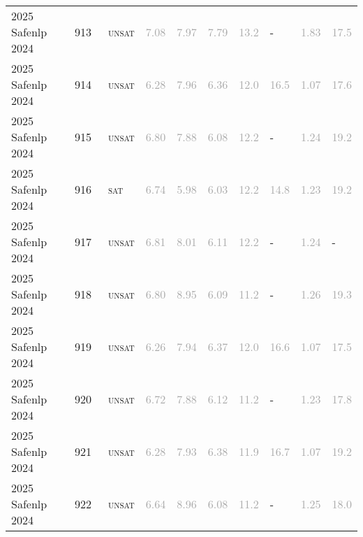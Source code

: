 \begin{center}
{\begin{longtable}{@{}llllllllll@{}}
2025 Safenlp 2024 & 913 & ~\textsc{unsat} & \textcolor{darkgray}{7.08} & \textcolor{darkgray}{7.97} & \textcolor{darkgray}{7.79} & \textcolor{darkgray}{13.2} & - & \textcolor{darkgray}{1.83} & \textcolor{darkgray}{17.5} \\
2025 Safenlp 2024 & 914 & ~\textsc{unsat} & \textcolor{darkgray}{6.28} & \textcolor{darkgray}{7.96} & \textcolor{darkgray}{6.36} & \textcolor{darkgray}{12.0} & \textcolor{darkgray}{16.5} & \textcolor{darkgray}{1.07} & \textcolor{darkgray}{17.6} \\
2025 Safenlp 2024 & 915 & ~\textsc{unsat} & \textcolor{darkgray}{6.80} & \textcolor{darkgray}{7.88} & \textcolor{darkgray}{6.08} & \textcolor{darkgray}{12.2} & - & \textcolor{darkgray}{1.24} & \textcolor{darkgray}{19.2} \\
2025 Safenlp 2024 & 916 & ~\textsc{sat} & \textcolor{darkgray}{6.74} & \textcolor{darkgray}{5.98} & \textcolor{darkgray}{6.03} & \textcolor{darkgray}{12.2} & \textcolor{darkgray}{14.8} & \textcolor{darkgray}{1.23} & \textcolor{darkgray}{19.2} \\
2025 Safenlp 2024 & 917 & ~\textsc{unsat} & \textcolor{darkgray}{6.81} & \textcolor{darkgray}{8.01} & \textcolor{darkgray}{6.11} & \textcolor{darkgray}{12.2} & - & \textcolor{darkgray}{1.24} & - \\
2025 Safenlp 2024 & 918 & ~\textsc{unsat} & \textcolor{darkgray}{6.80} & \textcolor{darkgray}{8.95} & \textcolor{darkgray}{6.09} & \textcolor{darkgray}{11.2} & - & \textcolor{darkgray}{1.26} & \textcolor{darkgray}{19.3} \\
2025 Safenlp 2024 & 919 & ~\textsc{unsat} & \textcolor{darkgray}{6.26} & \textcolor{darkgray}{7.94} & \textcolor{darkgray}{6.37} & \textcolor{darkgray}{12.0} & \textcolor{darkgray}{16.6} & \textcolor{darkgray}{1.07} & \textcolor{darkgray}{17.5} \\
2025 Safenlp 2024 & 920 & ~\textsc{unsat} & \textcolor{darkgray}{6.72} & \textcolor{darkgray}{7.88} & \textcolor{darkgray}{6.12} & \textcolor{darkgray}{11.2} & - & \textcolor{darkgray}{1.23} & \textcolor{darkgray}{17.8} \\
2025 Safenlp 2024 & 921 & ~\textsc{unsat} & \textcolor{darkgray}{6.28} & \textcolor{darkgray}{7.93} & \textcolor{darkgray}{6.38} & \textcolor{darkgray}{11.9} & \textcolor{darkgray}{16.7} & \textcolor{darkgray}{1.07} & \textcolor{darkgray}{19.2} \\
2025 Safenlp 2024 & 922 & ~\textsc{unsat} & \textcolor{darkgray}{6.64} & \textcolor{darkgray}{8.96} & \textcolor{darkgray}{6.08} & \textcolor{darkgray}{11.2} & - & \textcolor{darkgray}{1.25} & \textcolor{darkgray}{18.0} \\

\end{longtable}}
\end{center}
